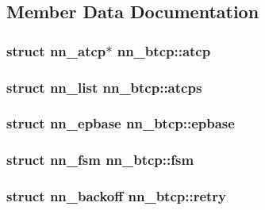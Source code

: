 \subsection{Member Data Documentation}
\subsubsection[{atcp}]{\setlength{\rightskip}{0pt plus 5cm}struct {\bf nn\+\_\+atcp}$\ast$ nn\+\_\+btcp\+::atcp}\hypertarget{structnn__btcp_a938d221e28e4dd8b259f446287677a7b}{}\label{structnn__btcp_a938d221e28e4dd8b259f446287677a7b}
\subsubsection[{atcps}]{\setlength{\rightskip}{0pt plus 5cm}struct {\bf nn\+\_\+list} nn\+\_\+btcp\+::atcps}\hypertarget{structnn__btcp_a12b26d20ebff3da6c00c5dce249e2003}{}\label{structnn__btcp_a12b26d20ebff3da6c00c5dce249e2003}
\subsubsection[{epbase}]{\setlength{\rightskip}{0pt plus 5cm}struct {\bf nn\+\_\+epbase} nn\+\_\+btcp\+::epbase}\hypertarget{structnn__btcp_acf1bdc439c5e15227dcb9da067d33c82}{}\label{structnn__btcp_acf1bdc439c5e15227dcb9da067d33c82}
\subsubsection[{fsm}]{\setlength{\rightskip}{0pt plus 5cm}struct {\bf nn\+\_\+fsm} nn\+\_\+btcp\+::fsm}\hypertarget{structnn__btcp_a6886990fa4dd60e2535396aee2a97808}{}\label{structnn__btcp_a6886990fa4dd60e2535396aee2a97808}
\subsubsection[{retry}]{\setlength{\rightskip}{0pt plus 5cm}struct {\bf nn\+\_\+backoff} nn\+\_\+btcp\+::retry}\hypertarget{structnn__btcp_a113d8b4835aeec6c8df2f7cf9ffdea5f}{}\label{structnn__btcp_a113d8b4835aeec6c8df2f7cf9ffdea5f}
